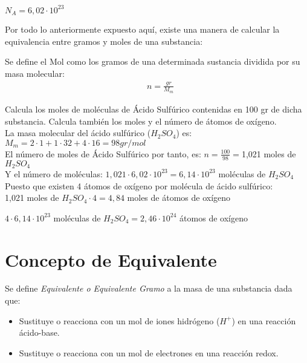 \begin{center}
$N_A=6,02\cdot10^{23}$
\end{center}
Por todo lo anteriormente expuesto aquí, existe una manera de calcular la equivalencia entre gramos y moles de una substancia:

\begin{definition}
	Se define el Mol como los gramos de una determinada sustancia dividida por su masa molecular:
	\begin{align}
		& n=\frac{gr}{M_m}
	\end{align}
\end{definition}

\begin{exercise}
	Calcula los moles de moléculas de Ácido Sulfúrico contenidas en 100 gr de dicha substancia. Calcula también los moles y el número de átomos de oxígeno.\\
	
	La masa molecular del ácido sulfúrico ($H_2SO_4$) es:
	$M_m = 2\cdot1 + 1\cdot32 + 4\cdot16 = 98 gr/mol$\\
	
	El número de moles de Ácido Sulfúrico por tanto, es:
	$n = \frac{100}{98} = $1,021 moles de $H_2SO_4$\\
	
	Y el número de moléculas: 
	$1,021\cdot6,02\cdot10^{23} = 6,14\cdot10^{23}$  moléculas de $H_2SO_4$\\
	
	Puesto que existen 4 átomos de oxígeno por molécula de ácido sulfúrico:\\
	
	1,021 moles de $H_2SO_4 \cdot 4 = 4,84$ moles de átomos de oxígeno
	
	$4 \cdot 6,14 \cdot10^{23}$  moléculas de $H_2SO_4 = 2,46 \cdot10^{24}$ átomos de oxígeno
	
\end{exercise}

\section{Concepto de Equivalente}

Se define \emph{Equivalente o Equivalente Gramo} a la masa de una substancia dada que:\\

\begin{itemize}
	\item Sustituye o reacciona con un mol de iones hidrógeno ($H^+$) en una reacción ácido-base.\\
	\item Sustituye o reacciona con un mol de electrones en una reacción redox.\\
\end{itemize}

